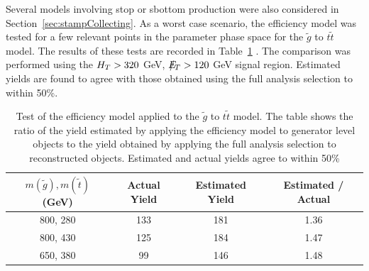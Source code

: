 Several models involving stop or sbottom production were also considered in Section~\ref{sec:stampCollecting}.  As a worst case scenario, the efficiency model was tested for a few relevant points in the parameter phase space for the $\widetilde{g}$ to $t\widetilde{t}$ model.  The results of these tests are recorded in Table~\ref{tab:gluinostopefftest} .  The comparison was performed using the $H_T > 320$ GeV, $E\!\!\!\!/_T > 120$ GeV signal region.  Estimated yields are found to agree with those obtained using the full analysis selection to within 50\%.

\begin{table}
\begin{center}
\begin{tabular}{c | c c c}
\hline\hline
$m(\widetilde{g}), m(\widetilde{t})$ (GeV) & Actual Yield &  Estimated Yield & Estimated / Actual \\
\hline
800, 280 & 133 & 181 & 1.36 \\
800, 430 & 125 & 184 & 1.47 \\
650, 380 & 99 & 146 & 1.48 \\
\hline\hline
\end{tabular}
\caption{\label{tab:gluinostopefftest} Test of the efficiency model applied to the $\widetilde{g}$ to $t\widetilde{t}$ model.  The table shows the ratio of the yield estimated by applying the efficiency model to generator level objects to the yield obtained by applying the full analysis selection to reconstructed objects.  Estimated and actual yields agree to within 50\%}
\end{center}
\end{table}
